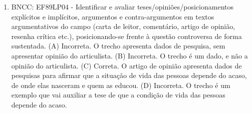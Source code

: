 \begin{enumerate}
\item
BNCC: EF89LP04 - Identificar e avaliar teses/opiniões/posicionamentos
explícitos e implícitos, argumentos e contra-argumentos em textos
argumentativos do campo (carta de leitor, comentário, artigo de opinião,
resenha crítica etc.), posicionando-se frente à questão controversa de
forma sustentada. (A) Incorreta. O trecho apresenta dados de pesquisa, sem apresentar opinião do articulista. (B) Incorreta. O trecho é um dado, e não a opinião do articulista. (C) Correta. O artigo de opinião apresenta dados de pesquisas para afirmar que a situação de vida das pessoas depende do acaso, de onde elas nasceram e quem as educou. (D) Incorreta. O trecho é um exemplo que vai auxiliar a tese de que a condição de vida das pessoas depende do acaso.
\end{enumerate}


